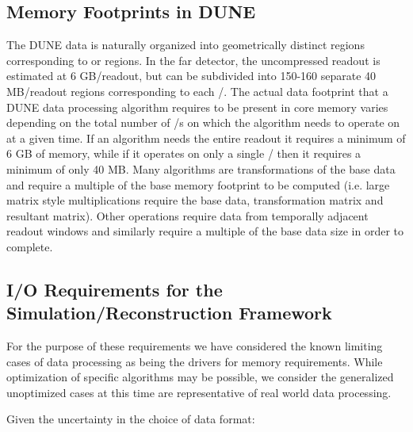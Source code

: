\documentclass[../main-v1.tex]{subfiles}
\begin{document}
\subsection{Memory Footprints in DUNE}
The DUNE  data is naturally organized into geometrically distinct regions corresponding to  or  regions.  In the far detector, the uncompressed readout is estimated at 6 GB/readout, but can be subdivided into 150-160 separate 40 MB/readout regions corresponding to each /.  The actual data footprint that a DUNE data processing algorithm requires to be present in core memory varies depending on the total number of /s on which the algorithm needs to operate on at a given time. If an algorithm needs the entire readout it requires a minimum of 6 GB of memory, while if it operates on only a single / then it requires a minimum of only 40 MB.  Many  algorithms are transformations of the base data and require a multiple of the base memory footprint to be computed (i.e. large matrix style multiplications require the base data, transformation matrix and resultant matrix).  Other operations require data from temporally adjacent readout windows and similarly require a multiple of the base data size in order to complete.

\subsection{I/O Requirements for the Simulation/Reconstruction Framework}

For the purpose of these requirements we have considered the known limiting cases of data processing as being the drivers for memory requirements.  While optimization of specific algorithms may be possible, we consider the generalized unoptimized cases at this time are representative of real world data processing.

Given the uncertainty in the choice of data format:
\end{document}
